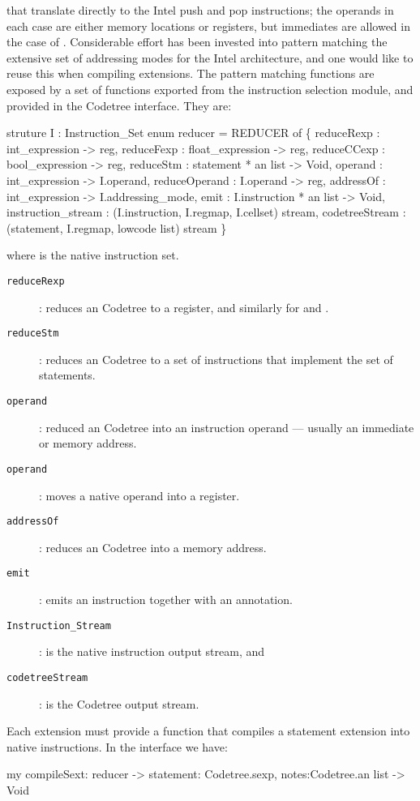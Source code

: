 that translate directly to the Intel push and pop instructions; the
operands in each case are either memory locations or registers, but
immediates are allowed in the case of . Considerable effort 
has been invested into pattern matching the extensive set of
addressing modes for the Intel architecture, and
one would like to reuse this when compiling extensions. The pattern
matching functions are exposed by a set of functions exported from the 
instruction selection module, and provided in the Codetree
interface. They are: 

\begin{SML}
  struture I : Instruction_Set
  enum reducer = 
    REDUCER of \{
      reduceRexp    : int_expression -> reg,
      reduceFexp    : float_expression -> reg,
      reduceCCexp   : bool_expression -> reg,
      reduceStm     : statement * an list -> Void,
      operand       : int_expression -> I.operand,
      reduceOperand : I.operand -> reg,
      addressOf     : int_expression -> I.addressing_mode,
      emit          : I.instruction * an list -> Void,
      instruction_stream   : (I.instruction, I.regmap, I.cellset) stream,
      codetreeStream  : (statement, I.regmap, lowcode list) stream
    \}
\end{SML}

where  is the native instruction set. 
\begin{description}
\item[\tt reduceRexp]: reduces an Codetree  to a register, and
	similarly for  and .
\item[\tt reduceStm]: reduces an Codetree  to a set of instructions
	that implement the set of statements.
\item[\tt operand]: reduced an Codetree  into an instruction
operand --- usually an immediate or memory address.
\item[\tt operand]: moves a native operand into a register.
\item[\tt addressOf]: reduces an Codetree  into a memory address.
\item[\tt emit]: emits an instruction together with an annotation.
\item[\tt Instruction_Stream]: is the native instruction output stream, and
\item[\tt codetreeStream]: is the Codetree output stream.
\end{description}

Each extension must provide a function  that compiles
a statement extension into native instructions. In the
 interface we have:
\begin{SML}
  my compileSext: reducer -> {statement: Codetree.sexp, notes:Codetree.an list} -> Void
\end{SML}

